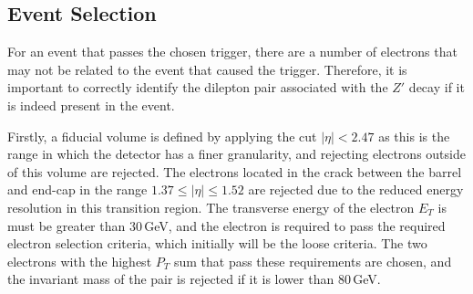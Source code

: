 \documentclass{article}
\begin{document}

\subsection{Event Selection}
\label{sec:cuts_eventSelection}

For an event that passes the chosen trigger, there are a number of electrons that may not be related to the event that caused the trigger. Therefore, it is important to correctly identify the dilepton pair associated with the $Z'$ decay if it is indeed present in the event. 

Firstly, a fiducial volume is defined by applying the cut $|\eta|<2.47$ as this is the range in which the detector has a finer granularity, and rejecting electrons outside of this volume are rejected. 
The electrons located in the crack between the barrel and end-cap in the range $1.37\leq|\eta|\leq1.52$ are rejected due to the reduced energy resolution in this transition region. 
The transverse energy of the electron $E_T$ is must be greater than $30\,$GeV, and the electron is required to pass the required electron selection criteria, which initially will be the loose criteria.
The two electrons with the highest $P_T$ sum that pass these requirements are chosen, and the invariant mass of the pair is rejected if it is lower than $80\,$GeV.
\end{document}
